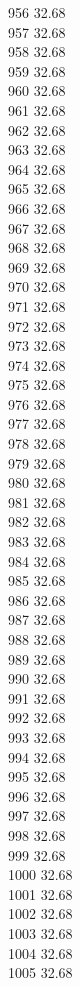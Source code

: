 956	32.68\\
957	32.68\\
958	32.68\\
959	32.68\\
960	32.68\\
961	32.68\\
962	32.68\\
963	32.68\\
964	32.68\\
965	32.68\\
966	32.68\\
967	32.68\\
968	32.68\\
969	32.68\\
970	32.68\\
971	32.68\\
972	32.68\\
973	32.68\\
974	32.68\\
975	32.68\\
976	32.68\\
977	32.68\\
978	32.68\\
979	32.68\\
980	32.68\\
981	32.68\\
982	32.68\\
983	32.68\\
984	32.68\\
985	32.68\\
986	32.68\\
987	32.68\\
988	32.68\\
989	32.68\\
990	32.68\\
991	32.68\\
992	32.68\\
993	32.68\\
994	32.68\\
995	32.68\\
996	32.68\\
997	32.68\\
998	32.68\\
999	32.68\\
1000	32.68\\
1001	32.68\\
1002	32.68\\
1003	32.68\\
1004	32.68\\
1005	32.68\\
